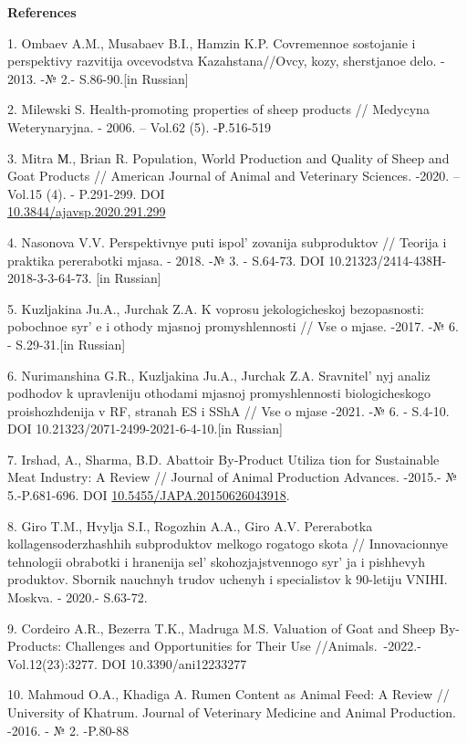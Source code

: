 \begin{center}
{\bfseries References}
\end{center}

\begin{refs}
1. Ombaev A.M., Musabaev B.I., Hamzin K.P. Covremennoe sostojanie i
perspektivy razvitija ovcevodstva Kazahstana//Ovcy, kozy, sherstjanoe
delo. - 2013. -№ 2.- S.86-90.{[}in Russian{]}

2. Milewski S. Health-promoting properties of sheep products // Medycyna
Weterynaryjna. - 2006. -- Vol.62 (5). -Р.516-519

3. Mitra М., Brian R. Population, World Production and Quality of Sheep
and Goat Products // American Journal of Animal and Veterinary Sciences.
-2020. -- Vol.15 (4). - P.291-299. DOI\\
\href{https://doi.org/10.3844/ajavsp.2020.291.299}{10.3844/ajavsp.2020.291.299}

4. Nasonova V.V. Perspektivnye puti ispol' zovanija
subproduktov // Teorija i praktika pererabotki mjasa. - 2018. -№ 3. -
S.64-73. DOI 10.21323/2414-438H-2018-3-3-64-73. {[}in Russian{]}

5. Kuzljakina Ju.A., Jurchak Z.A. K voprosu jekologicheskoj
bezopasnosti: pobochnoe syr' e i othody mjasnoj
promyshlennosti // Vse o mjase. -2017. -№ 6. - S.29-31.{[}in Russian{]}

6. Nurimanshina G.R., Kuzljakina Ju.A., Jurchak Z.A.
Sravnitel' nyj analiz podhodov k upravleniju othodami
mjasnoj promyshlennosti biologicheskogo proishozhdenija v RF, stranah ES
i SShA // Vse o mjase -2021. -№ 6. - S.4-10. DOI
10.21323/2071-2499-2021-6-4-10.{[}in Russian{]}

7. Irshad, A., Sharma, B.D. Abattoir By‑Product Utiliza tion for
Sustainable Meat Industry: A Review // Journal of Animal Production
Advances. -2015.- № 5.-P.681-696.
DOI \href{https://doi.org/10.5455/JAPA.20150626043918}{10.5455/JAPA.20150626043918}.

8. Giro T.M., Hvylja S.I., Rogozhin A.A., Giro A.V. Pererabotka
kollagensoderzhashhih subproduktov melkogo rogatogo skota //
Innovacionnye tehnologii obrabotki i hranenija
sel' skohozjajstvennogo syr' ja i
pishhevyh produktov. Sbornik nauchnyh trudov uchenyh i specialistov k
90-letiju VNIHI. Moskva. - 2020.- S.63-72.

9. Cordeiro A.R., Bezerra T.K., Madruga M.S. Valuation of Goat and Sheep
By-Products: Challenges and Opportunities for Their Use
//Animals.~-2022.-Vol.12(23):3277. DOI 10.3390/ani12233277

10. Mahmoud O.A., Khadiga A. Rumen Content as Animal Feed: A Review //
University of Khatrum. Journal of Veterinary Medicine and Animal
Production. -2016. - № 2. -P.80-88
\end{refs}

